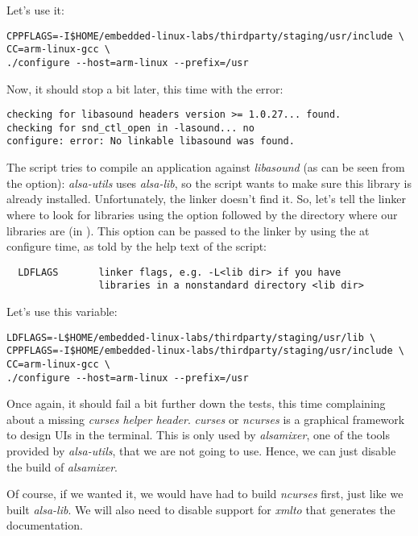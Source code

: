 Let's use it:

\begin{verbatim}
CPPFLAGS=-I$HOME/embedded-linux-labs/thirdparty/staging/usr/include \
CC=arm-linux-gcc \
./configure --host=arm-linux --prefix=/usr
\end{verbatim}

Now, it should stop a bit later, this time with the error:
\begin{verbatim}
checking for libasound headers version >= 1.0.27... found.
checking for snd_ctl_open in -lasound... no
configure: error: No linkable libasound was found.
\end{verbatim}

The  script tries to compile an application against {\em
  libasound} (as can be seen from the  option): {\em
  alsa-utils} uses {\em alsa-lib}, so the \code{configure} script
wants to make sure this library is already installed. Unfortunately,
the \code{ld} linker doesn't find it. So, let's tell the
linker where to look for libraries using the  option followed
by the directory where our libraries are (in
\code{staging/usr/lib}). This \code{-L} option can be passed to the
linker by using the \code{LDFLAGS} at configure time, as told by the
help text of the \code{configure} script:

\begin{verbatim}
  LDFLAGS       linker flags, e.g. -L<lib dir> if you have
                libraries in a nonstandard directory <lib dir>
\end{verbatim}

Let's use this  variable:

\begin{verbatim}
LDFLAGS=-L$HOME/embedded-linux-labs/thirdparty/staging/usr/lib \
CPPFLAGS=-I$HOME/embedded-linux-labs/thirdparty/staging/usr/include \
CC=arm-linux-gcc \
./configure --host=arm-linux --prefix=/usr
\end{verbatim}

Once again, it should fail a bit further down the tests, this time
complaining about a missing {\em curses helper header}. {\em curses}
or {\em ncurses} is a graphical framework to design UIs in the
terminal. This is only used by {\em alsamixer}, one of the tools
provided by {\em alsa-utils}, that we are not going to use.
Hence, we can just disable the build of {\em alsamixer}.

Of course, if we wanted it, we would have had to build {\em ncurses} first,
just like we built {\em alsa-lib}. We will also need to disable support
for {\em xmlto} that generates the documentation.

